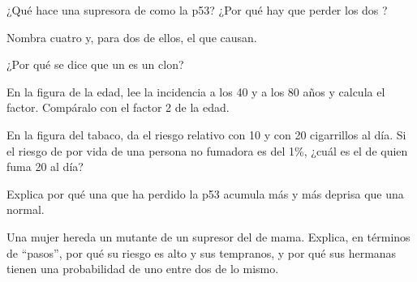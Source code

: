 \begin{exercise}[$\star$]\label{exo:g11:cancer:3}
¿Qué hace una  supresora de  como la p53? ¿Por qué hay
que perder los dos ?
\end{exercise}

\begin{exercise}[$\star$]\label{exo:g11:cancer:4}
Nombra cuatro  y, para dos de ellos, el  que causan.
\end{exercise}

\begin{exercise}[$\star$]\label{exo:g11:cancer:5}
¿Por qué se dice que un  es un clon?
\end{exercise}

\begin{exercise}[$\star\star$]\label{exo:g11:cancer:6}
En la figura de la edad, lee la incidencia a los 40 y a los 80 años y
calcula el factor. Compáralo con el factor 2 de la edad.
\end{exercise}

\begin{exercise}[$\star\star$]\label{exo:g11:cancer:7}
En la figura del tabaco, da el riesgo relativo con 10 y con 20
cigarrillos al día. Si el riesgo de por vida de una persona no fumadora
es del 1\%, ¿cuál es el de quien fuma 20 al día?
\end{exercise}

\begin{exercise}[$\star\star$]\label{exo:g11:cancer:8}
Explica por qué una  que ha perdido la p53 acumula más 
y más deprisa que una  normal.
\end{exercise}

\begin{exercise}[$\star\star$]\label{exo:g11:cancer:9}
Una mujer hereda un  mutante de un  supresor del  de
mama. Explica, en términos de ``pasos'', por qué su riesgo es alto y
sus  tempranos, y por qué sus hermanas tienen una probabilidad
de uno entre dos de lo mismo.
\end{exercise}

